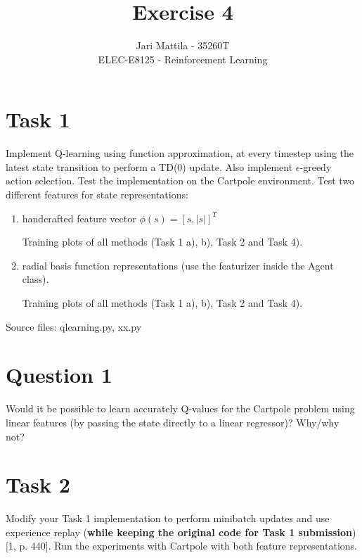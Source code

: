 \documentclass[12pt]{article}
\begin{document}
 
\title{Exercise 4}
\author{Jari Mattila - 35260T\\
ELEC-E8125 - Reinforcement Learning}

\maketitle

\section*{Task 1}

Implement Q-learning using function approximation, at every timestep
using the latest state transition to perform a TD(0) update. Also implement $\epsilon$-greedy action
selection. Test the implementation on the Cartpole environment. Test two different features for
state representations:

\begin{enumerate}[label=(\alph*)]
    \item handcrafted feature vector $\phi(s) = [s,|s|]^T$

Training plots of all methods (Task 1 a), b), Task 2 and Task 4).    
    
    \item radial basis function representations (use the featurizer inside the Agent class).

Training plots of all methods (Task 1 a), b), Task 2 and Task 4).
    
\end{enumerate}

\noindent
Source files: qlearning.py, xx.py 

\section*{Question 1}

Would it be possible to learn accurately Q-values for the Cartpole
problem using linear features (by passing the state directly to a linear regressor)? Why/why
not?

\section*{Task 2}

Modify your Task 1 implementation to perform minibatch updates and
use experience replay (\textbf{while keeping the original code for Task 1 submission}) [1, p. 440].
Run the experiments with Cartpole with both feature representations.
\newline
\end{document}
